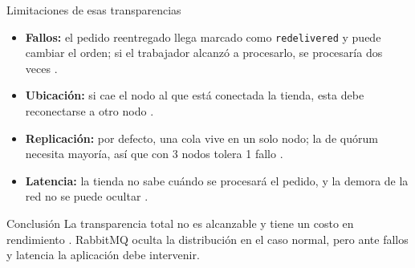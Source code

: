 \begin{frame}{Limitaciones de esas transparencias}
  \begin{itemize}
    \item \textbf{Fallos:} el pedido reentregado llega marcado como
          \texttt{redelivered} y puede cambiar el orden; si el trabajador
          alcanzó a procesarlo, se procesaría dos veces
          \cite{rabbitmq2026queues,fu2021fair}.
    \item \textbf{Ubicación:} si cae el nodo al que está conectada la
          tienda, esta debe reconectarse a otro nodo
          \cite{rabbitmq2026clustering}.
    \item \textbf{Replicación:} por defecto, una cola vive en un solo nodo;
          la de quórum necesita mayoría, así que con 3 nodos tolera 1 fallo
          \cite{rabbitmq2026clustering,rabbitmq2026quorum}.
    \item \textbf{Latencia:} la tienda no sabe cuándo se procesará el
          pedido, y la demora de la red no se puede ocultar
          \cite{vansteen2023distributed}.
  \end{itemize}

  \begin{block}{Conclusión}
    La transparencia total no es alcanzable y tiene un costo en rendimiento
    \cite{vansteen2023distributed}. RabbitMQ oculta la distribución en el
    caso normal, pero ante fallos y latencia la aplicación debe intervenir.
  \end{block}
\end{frame}
